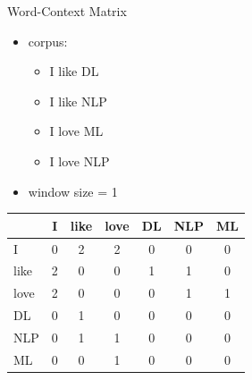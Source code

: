 \begin{frame}{Word-Context Matrix}
\begin{itemize}
    \item corpus:
\begin{itemize}
    \item I like DL
    \item I like NLP
    \item I love ML
    \item I love NLP
\end{itemize}
\item window size = 1

\end{itemize}
{
\begin{table}[!h]
    \centering
    \begin{tabular}{l|cccccc}
          &  I & like & love & DL & NLP &ML  \\
          \hline
         I & 0 & 2 & 2 & 0 &0 &0  \\
         like & 2 & 0 & 0 & 1 & 1 &0 \\
         love & 2 & 0 & 0 & 0 & 1 & 1 \\
         DL & 0 & 1 & 0 & 0 & 0 & 0 \\
         NLP & 0 & 1 & 1 & 0 & 0  & 0\\
         ML & 0 & 0 & 1 & 0 & 0 & 0\\
         \hline
    \end{tabular}
\end{table}
}
\end{frame}


